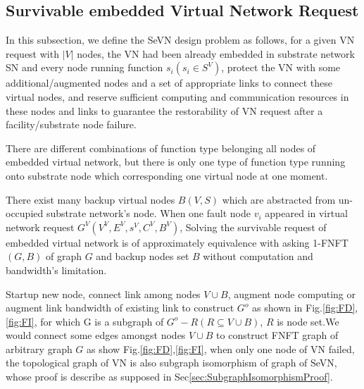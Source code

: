 



\subsection{Survivable embedded Virtual Network Request}

In this subsection, we define the SeVN design problem as follows, for a given VN request with $|V|$ nodes, the VN had been already embedded in substrate network SN and every node running function $s_i(s_i\in S^V)$, protect the VN with some additional/augmented nodes and a set of appropriate links to connect these virtual nodes, and reserve sufficient computing and communication resources in these nodes and links to guarantee the restorability of VN request after a facility/substrate node failure.


There are different combinations of function type belonging all nodes of embedded virtual network, but there is only one type of function type running onto substrate node which corresponding one virtual node at one moment.

There exist many backup virtual nodes $B(V,S)$ which are abstracted from un-occupied substrate network's node. When one fault node $v_i$ appeared in virtual network request $G^V (V^V,E^V,s^V,C^V,B^V)$, Solving the survivable request of embedded virtual network is of approximately equivalence with asking 1-FNFT$(G,B)$ of graph $G$ and backup nodes set $B$ without computation and bandwidth's limitation.
 
Startup new node, connect link among nodes $V\cup B$, augment node computing or augment link bandwidth of existing link to construct $G^o$ as shown in Fig.\ref{fig:FD},\ref{fig:FI}, for which G is a subgraph of $G^o-R(R \subseteq V\cup B)$, $R$ is node set.We would connect some edges amongst nodes $V\cup B$ to construct FNFT graph of arbitrary graph $G$ as show Fig.\ref{fig:FD},\ref{fig:FI}, when only one node of VN failed, the topological graph of VN is also subgraph isomorphism of graph of SeVN, whose proof is describe as supposed in Sec\ref{sec:SubgraphIsomorphismProof}. %

